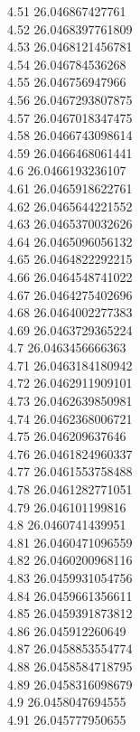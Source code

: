 {4.51	26.046867427761\\
4.52	26.0468397761809\\
4.53	26.0468121456781\\
4.54	26.046784536268\\
4.55	26.046756947966\\
4.56	26.0467293807875\\
4.57	26.0467018347475\\
4.58	26.0466743098614\\
4.59	26.0466468061441\\
4.6	26.0466193236107\\
4.61	26.0465918622761\\
4.62	26.0465644221552\\
4.63	26.0465370032626\\
4.64	26.0465096056132\\
4.65	26.0464822292215\\
4.66	26.0464548741022\\
4.67	26.0464275402696\\
4.68	26.0464002277383\\
4.69	26.0463729365224\\
4.7	26.0463456666363\\
4.71	26.0463184180942\\
4.72	26.0462911909101\\
4.73	26.0462639850981\\
4.74	26.0462368006721\\
4.75	26.046209637646\\
4.76	26.0461824960337\\
4.77	26.0461553758488\\
4.78	26.0461282771051\\
4.79	26.046101199816\\
4.8	26.0460741439951\\
4.81	26.0460471096559\\
4.82	26.0460200968116\\
4.83	26.0459931054756\\
4.84	26.0459661356611\\
4.85	26.0459391873812\\
4.86	26.045912260649\\
4.87	26.0458853554774\\
4.88	26.0458584718795\\
4.89	26.0458316098679\\
4.9	26.0458047694555\\
4.91	26.045777950655\\
}
